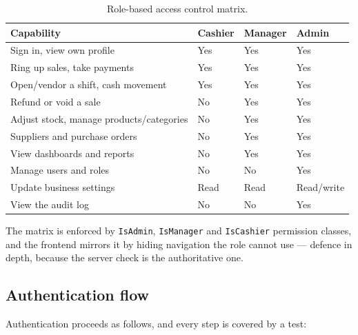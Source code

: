 \documentclass[11pt,a4paper]{article}
\begin{document}
\begin{table}[htbp]\centering
\small
\caption{Role-based access control matrix.}
\label{tab:rbac}
\begin{tabular}{@{}p{}p{}p{}p{}@{}}
\toprule
\textbf{Capability} & \textbf{Cashier} & \textbf{Manager} & \textbf{Admin} \\
\midrule
Sign in, view own profile & Yes & Yes & Yes \\
Ring up sales, take payments & Yes & Yes & Yes \\
Open/vendor a shift, cash movement & Yes & Yes & Yes \\
Refund or void a sale & No & Yes & Yes \\
Adjust stock, manage products/categories & No & Yes & Yes \\
Suppliers and purchase orders & No & Yes & Yes \\
View dashboards and reports & No & Yes & Yes \\
Manage users and roles & No & No & Yes \\
Update business settings & Read & Read & Read/write \\
View the audit log & No & No & Yes \\
\bottomrule
\end{tabular}
\end{table}

\noindent
The matrix is enforced by \texttt{IsAdmin}, \texttt{IsManager} and \texttt{IsCashier} permission
classes, and the frontend mirrors it by hiding navigation the role cannot use --- defence in depth,
because the server check is the authoritative one.

\subsection{Authentication flow}

Authentication proceeds as follows, and every step is covered by a test:
\end{document}
